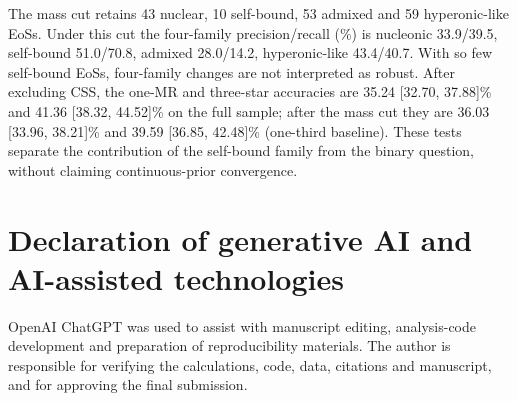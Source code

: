 \documentclass[11pt,a4paper]{article}
\begin{document}
The mass cut retains 43 nuclear, 10 self-bound, 53 admixed and 59 hyperonic-like EoSs. Under this cut the four-family precision/recall (\%) is nucleonic 33.9/39.5, self-bound 51.0/70.8, admixed 28.0/14.2, hyperonic-like 43.4/40.7. With so few self-bound EoSs, four-family changes are not interpreted as robust. After excluding CSS, the one-MR and three-star accuracies are 35.24 [32.70, 37.88]\% and 41.36 [38.32, 44.52]\% on the full sample; after the mass cut they are 36.03 [33.96, 38.21]\% and 39.59 [36.85, 42.48]\% (one-third baseline). These tests separate the contribution of the self-bound family from the binary question, without claiming continuous-prior convergence.
\section*{Declaration of generative AI and AI-assisted technologies}
OpenAI ChatGPT was used to assist with manuscript editing, analysis-code development and preparation of reproducibility materials. The author is responsible for verifying the calculations, code, data, citations and manuscript, and for approving the final submission.
\end{document}
